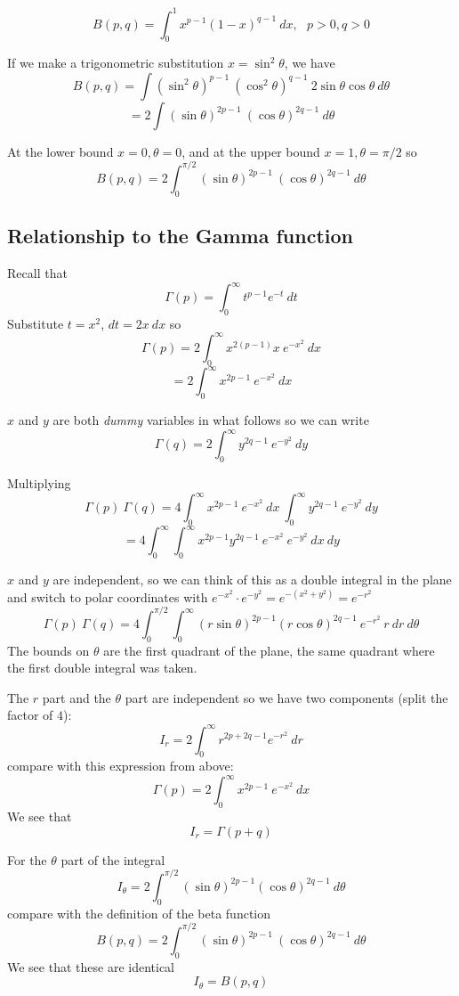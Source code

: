\documentclass[11pt, oneside]{article}
\begin{document}
\[ B (p,q) = \int_0^1 x^{p - 1} (1 - x)^{q - 1} \ dx, \ \ \ p > 0, q > 0 \]

If we make a trigonometric substitution $x = \sin^2 \theta$, we have
\[ B (p,q) = \int (\sin^2 \theta)^{p - 1} \ (\cos^2 \theta)^{q - 1} \ 2 \sin \theta \cos \theta \ d \theta \]
\[  = 2 \int (\sin \theta)^{2p - 1} \ (\cos \theta)^{2q - 1} \ d \theta \]

At the lower bound $x = 0, \theta = 0$, and at the upper bound $x = 1, \theta = \pi/2$ so
\[  B (p,q) = 2 \int_0^{\pi/2} (\sin \theta)^{2p - 1} \ (\cos \theta)^{2q - 1} \ d \theta \]

\subsection*{Relationship to the Gamma function}
Recall that
\[ \Gamma(p) = \int_0^{\infty} t^{p-1} e^{-t} \ dt \]
Substitute $t = x^2$, $dt = 2x \ dx$ so
\[ \Gamma(p) = 2 \int_0^{\infty} x^{2(p-1)} x \ e^{-x^2} \ dx \]
\[ = 2 \int_0^{\infty} x^{2p-1} \ e^{-x^2} \ dx \]

$x$ and $y$ are both \emph{dummy} variables in what follows so we can write
\[ \Gamma(q) = 2 \int_0^{\infty} y^{2q-1} \ e^{-y^2} \ dy \]

Multiplying
\[ \Gamma(p) \ \Gamma(q) = 4 \int_0^{\infty} x^{2p-1} \ e^{-x^2} \ dx \  \int_0^{\infty} y^{2q-1} \ e^{-y^2} \ dy \]
\[ = 4 \int_0^{\infty} \int_0^{\infty} x^{2p-1} y^{2q-1} \ e^{-x^2} \ e^{-y^2} \ dx \ dy \]

$x$ and $y$ are independent, so we can think of this as a double integral in the plane and switch to polar coordinates with $e^{-x^2} \cdot e^{-y^2}  = e^{-(x^2 + y^2)} = e^{-r^2}$
\[ \Gamma(p) \ \Gamma(q) = 4  \int_0^{\pi/2} \int_0^{\infty} (r \sin \theta)^{2p-1} (r \cos \theta)^{2q-1} \ e^{-r^2}  \ r \ dr \ d \theta  \]
The bounds on $\theta$ are the first quadrant of the plane, the same quadrant where the first double integral was taken.

The $r$ part and the $\theta$ part are independent so we have two components (split the factor of $4$):
\[ I_r = 2 \int_0^{\infty} r^{2p + 2q - 1} e^{-r^2} \ dr  \]
compare with this expression from above:
\[ \Gamma(p) = 2 \int_0^{\infty} x^{2p-1} \ e^{-x^2} \ dx \]
We see that 
\[ I_r = \Gamma (p + q) \]

For the $\theta$ part of the integral
\[ I_{\theta} = 2 \int_0^{\pi/2}  (\sin \theta)^{2p-1} (\cos \theta)^{2q-1} \ d \theta  \]
compare with the definition of the beta function
\[  B (p,q) = 2 \int_0^{\pi/2} (\sin \theta)^{2p - 1} \ (\cos \theta)^{2q - 1} \ d \theta \]
We see that these are identical 
\[ I_{\theta} = B(p,q) \]
\end{document}
